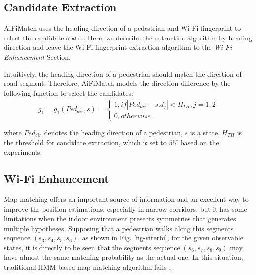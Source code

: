 \documentclass{llncs}
\begin{document}
\subsection{Candidate Extraction}

AiFiMatch uses the heading direction of a pedestrian and Wi-Fi fingerprint to select the candidate states. Here, we describe the extraction algorithm by heading direction and leave the Wi-Fi fingerprint extraction algorithm to the \emph{Wi-Fi Enhancement} Section.
	 
Intuitively, the heading direction of a pedestrian should match the direction of road segment. Therefore, AiFiMatch models the direction difference by the following function to select the candidates:
\begin{equation}
{g_1} = {g_1}({Ped_{dir}},s) = \left\{ {\begin{array}{*{20}{l}}
	{1,if\left| {{Ped_{dir}} - s.{d_j}} \right| < H_{TH},j = 1,2}\\
	{0,otherwise}
	\end{array}} \right.
\end{equation}

where $Ped_{dir}$ denotes the heading direction of a pedestrian, $s$ is a state, $H_{TH}$ is the threshold for candidate extraction, which is set to $55^\circ$ based on the experiments.

\subsection{Wi-Fi Enhancement}
Map matching offers an important source of information and an excellent way to improve the position estimations, especially in narrow corridors, but it has some limitations when the indoor environment presents symmetries that generates multiple hypotheses. Supposing that a pedestrian walks along this segments sequence $(s_3, s_4, s_5, s_6)$, as shown in Fig. \ref{fig-viterbi}, for the given observable states, it is directly to be seen that the segments sequence $(s_6, s_7, s_8, s_9)$ may have almost the same matching probability as the actual one. In this situation, traditional HMM based map matching algorithm fails \cite{zhou2015activity}.
\end{document}
